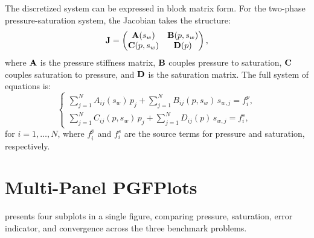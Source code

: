 The discretized system can be expressed in block matrix form. For the two-phase pressure-saturation system, the Jacobian takes the structure:
\begin{equation}
    \mathbf{J} = \begin{pmatrix}
        \mathbf{A}(s_w) & \mathbf{B}(p, s_w) \\
        \mathbf{C}(p, s_w) & \mathbf{D}(p)
    \end{pmatrix},
    \label{eq:matrix}
\end{equation}
where $\mathbf{A}$ is the pressure stiffness matrix, $\mathbf{B}$ couples pressure to saturation, $\mathbf{C}$ couples saturation to pressure, and $\mathbf{D}$ is the saturation matrix. The full system of equations is:
\begin{equation}
    \begin{cases}
        \displaystyle \sum_{j=1}^{N} A_{ij}(s_w) \, p_j + \sum_{j=1}^{N} B_{ij}(p, s_w) \, s_{w,j} = f_i^p, \\[10pt]
        \displaystyle \sum_{j=1}^{N} C_{ij}(p, s_w) \, p_j + \sum_{j=1}^{N} D_{ij}(p) \, s_{w,j} = f_i^s,
    \end{cases}
    \label{eq:system}
\end{equation}
for $i = 1, \ldots, N$, where $f_i^p$ and $f_i^s$ are the source terms for pressure and saturation, respectively.

\section{Multi-Panel PGFPlots}
\label{sec:results:multi_panel}

 presents four subplots in a single figure, comparing pressure, saturation, error indicator, and convergence across the three benchmark problems.

